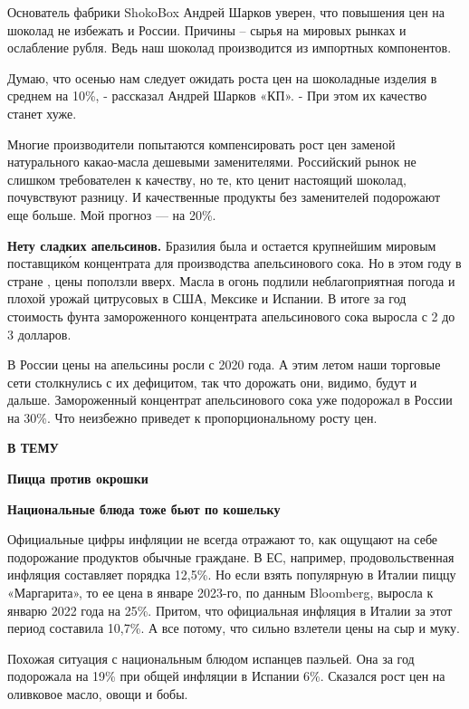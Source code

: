 Основатель фабрики ShokoBox Андрей Шарков уверен, что повышения цен на шоколад не избежать и России. Причины --  сырья на мировых рынках и ослабление рубля. Ведь наш шоколад производится из импортных компонентов.

\begin{fancyquotes}
    Думаю, что осенью нам следует ожидать роста цен на шоколадные изделия в среднем на 10\%, - рассказал Андрей Шарков «КП». - При этом их качество станет хуже.
\end{fancyquotes}

Многие производители попытаются компенсировать рост цен заменой натурального какао-масла дешевыми заменителями. Российский рынок не слишком требователен к качеству, но те, кто ценит настоящий шоколад, почувствуют разницу. И качественные продукты без заменителей подорожают еще больше. Мой прогноз --- на 20\%.

\textbf{Нету сладких апельсинов.} Бразилия была и остается крупнейшим мировым поставщик\'{о}м концентрата для производства апельсинового сока. Но в этом году в стране , цены поползли вверх. Масла в огонь подлили неблагоприятная погода и плохой урожай цитрусовых в США, Мексике и Испании. В итоге за год стоимость фунта замороженного концентрата апельсинового сока выросла с 2 до 3 долларов.

В России цены на апельсины росли с 2020 года. А этим летом наши торговые сети столкнулись с их дефицитом, так что дорожать они, видимо, будут и дальше. Замороженный концентрат апельсинового сока уже подорожал в России на 30\%. Что неизбежно приведет к пропорциональному росту цен.

\textbf{В ТЕМУ}

\textbf{Пицца против окрошки}

\textbf{Национальные блюда тоже бьют по кошельку}

Официальные цифры инфляции не всегда отражают то, как ощущают на себе подорожание продуктов обычные граждане. В ЕС, например, продовольственная инфляция составляет порядка 12,5\%. Но если взять популярную в Италии пиццу «Маргарита», то ее цена в январе 2023-го, по данным Bloomberg, выросла к январю 2022 года на 25\%. Притом, что официальная инфляция в Италии за этот период составила 10,7\%. А все потому, что сильно взлетели цены на сыр и муку.

Похожая ситуация с национальным блюдом испанцев паэльей. Она за год подорожала на 19\% при общей инфляции в Испании 6\%. Сказался рост цен на оливковое масло, овощи и бобы.

